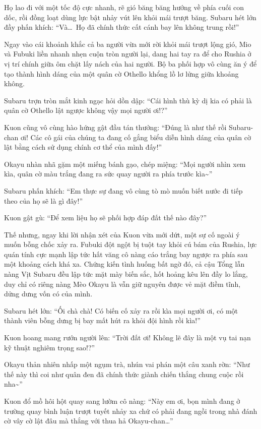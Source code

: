 \documentclass[../main.tex]{subfiles}
\begin{document}
Họ lao đi với một tốc độ cực nhanh, rẽ gió băng băng hướng về phía cuối con dốc, rồi đồng loạt dùng lực bật nhảy vút lên khỏi mái trượt băng. Subaru hét lớn đầy phấn khích: ``Và\dots\ Họ đã chính thức cất cánh bay lên không trung rồi!''

Ngay vào cái khoảnh khắc cả ba người vừa mới rời khỏi mái trượt lộng gió, Mio và Fubuki liền nhanh nhẹn cuộn tròn người lại, dang hai tay ra để cho Rushia ở vị trí chính giữa ôm chặt lấy nách của hai người. Bộ ba phối hợp vô cùng ăn ý để tạo thành hình dáng của một quân cờ Othello khổng lồ lơ lửng giữa khoảng không.

Subaru trợn tròn mắt kinh ngạc hỏi dồn dập: ``Cái hình thù kỳ dị kia có phải là quân cờ Othello lật ngược không vậy mọi người ơi!?''

Kuon cũng vô cùng hào hứng gật đầu tán thưởng: ``Đúng là như thế rồi Subaru-chan ơi! Các cô gái của chúng ta đang cố gắng biểu diễn hình dáng của quân cờ lật bằng cách sử dụng chính cơ thể của mình đấy!''

Okayu nhàn nhã gặm một miếng bánh gạo, chép miệng: ``Mọi người nhìn xem kìa, quân cờ màu trắng đang ra sức quay người ra phía trước kìa\~{}''

Subaru phấn khích: ``Em thực sự đang vô cùng tò mò muốn biết nước đi tiếp theo của họ sẽ là gì đây!''

Kuon gật gù: ``Để xem liệu họ sẽ phối hợp đáp đất thế nào đây?''

Thế nhưng, ngay khi lời nhận xét của Kuon vừa mới dứt, một sự cố ngoài ý muốn bỗng chốc xảy ra. Fubuki đột ngột bị tuột tay khỏi cú bám của Rushia, lực quán tính cực mạnh lập tức hất văng cô nàng cáo trắng bay ngược ra phía sau một khoảng cách khá xa. Chứng kiến tình huống bất ngờ đó, cả cậu Tổng lẫn nàng Vịt Subaru đều lập tức mặt mày biến sắc, hốt hoảng kêu lên đầy lo lắng, duy chỉ có riêng nàng Mèo Okayu là vẫn giữ nguyên được vẻ mặt điềm tĩnh, dửng dưng vốn có của mình.

Subaru hét lớn: ``Ối chà chà! Có biến cố xảy ra rồi kìa mọi người ơi, có một thành viên bỗng dưng bị bay mất hút ra khỏi đội hình rồi kìa!''

Kuon hoang mang rướn người lên: ``Trời đất ơi! Không lẽ đây là một vụ tai nạn kỹ thuật nghiêm trọng sao!?''

Okayu thản nhiên nhấp một ngụm trà, nhún vai phán một câu xanh rờn: ``Như thế này thì coi như quân đen đã chính thức giành chiến thắng chung cuộc rồi nha\~{}''

Kuon đổ mồ hôi hột quay sang lườm cô nàng: ``Này em ơi, bọn mình đang ở trường quay bình luận trượt tuyết nhảy xa chứ có phải đang ngồi trong nhà đánh cờ vây cờ lật đâu mà thắng với thua hả Okayu-chan\dots''
\end{document}
